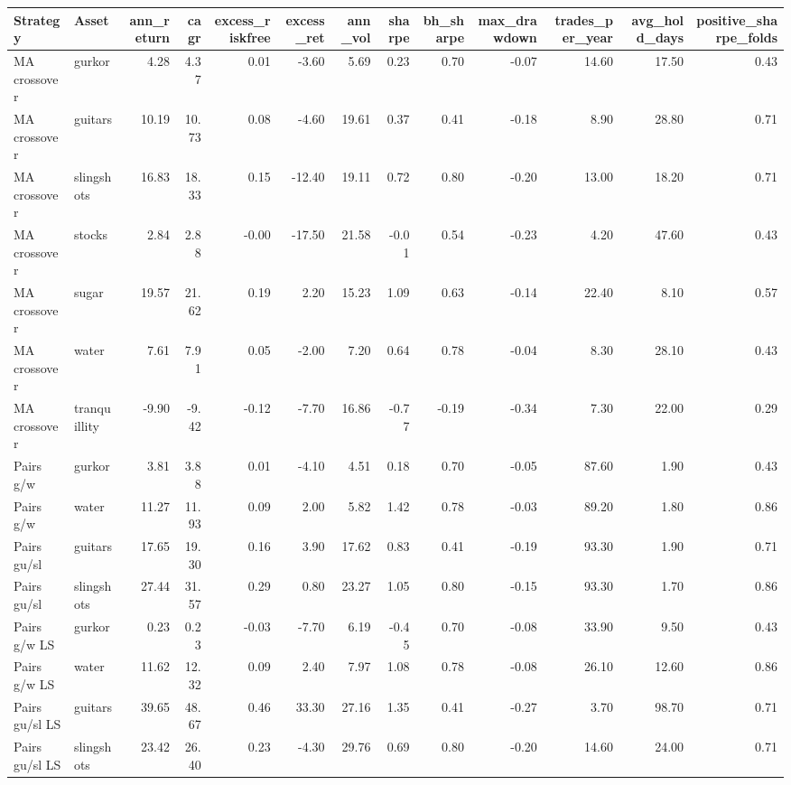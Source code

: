 \begin{tabular}{llrrrrrrrrrrr}
\toprule
Strategy & Asset & ann_return & cagr & excess_riskfree & excess_ret & ann_vol & sharpe & bh_sharpe & max_drawdown & trades_per_year & avg_hold_days & positive_sharpe_folds \\
\midrule
MA crossover & gurkor & 4.28 & 4.37 & 0.01 & -3.60 & 5.69 & 0.23 & 0.70 & -0.07 & 14.60 & 17.50 & 0.43 \\
MA crossover & guitars & 10.19 & 10.73 & 0.08 & -4.60 & 19.61 & 0.37 & 0.41 & -0.18 & 8.90 & 28.80 & 0.71 \\
MA crossover & slingshots & 16.83 & 18.33 & 0.15 & -12.40 & 19.11 & 0.72 & 0.80 & -0.20 & 13.00 & 18.20 & 0.71 \\
MA crossover & stocks & 2.84 & 2.88 & -0.00 & -17.50 & 21.58 & -0.01 & 0.54 & -0.23 & 4.20 & 47.60 & 0.43 \\
MA crossover & sugar & 19.57 & 21.62 & 0.19 & 2.20 & 15.23 & 1.09 & 0.63 & -0.14 & 22.40 & 8.10 & 0.57 \\
MA crossover & water & 7.61 & 7.91 & 0.05 & -2.00 & 7.20 & 0.64 & 0.78 & -0.04 & 8.30 & 28.10 & 0.43 \\
MA crossover & tranquillity & -9.90 & -9.42 & -0.12 & -7.70 & 16.86 & -0.77 & -0.19 & -0.34 & 7.30 & 22.00 & 0.29 \\
Pairs g/w & gurkor & 3.81 & 3.88 & 0.01 & -4.10 & 4.51 & 0.18 & 0.70 & -0.05 & 87.60 & 1.90 & 0.43 \\
Pairs g/w & water & 11.27 & 11.93 & 0.09 & 2.00 & 5.82 & 1.42 & 0.78 & -0.03 & 89.20 & 1.80 & 0.86 \\
Pairs gu/sl & guitars & 17.65 & 19.30 & 0.16 & 3.90 & 17.62 & 0.83 & 0.41 & -0.19 & 93.30 & 1.90 & 0.71 \\
Pairs gu/sl & slingshots & 27.44 & 31.57 & 0.29 & 0.80 & 23.27 & 1.05 & 0.80 & -0.15 & 93.30 & 1.70 & 0.86 \\
Pairs g/w LS & gurkor & 0.23 & 0.23 & -0.03 & -7.70 & 6.19 & -0.45 & 0.70 & -0.08 & 33.90 & 9.50 & 0.43 \\
Pairs g/w LS & water & 11.62 & 12.32 & 0.09 & 2.40 & 7.97 & 1.08 & 0.78 & -0.08 & 26.10 & 12.60 & 0.86 \\
Pairs gu/sl LS & guitars & 39.65 & 48.67 & 0.46 & 33.30 & 27.16 & 1.35 & 0.41 & -0.27 & 3.70 & 98.70 & 0.71 \\
Pairs gu/sl LS & slingshots & 23.42 & 26.40 & 0.23 & -4.30 & 29.76 & 0.69 & 0.80 & -0.20 & 14.60 & 24.00 & 0.71 \\
\bottomrule
\end{tabular}
